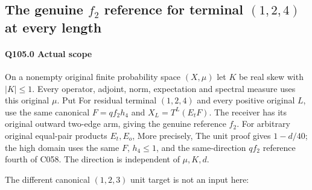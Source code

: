 \subsection{The genuine $f_2$ reference for terminal $(1,\allowbreak 2,\allowbreak 4)$ at every length}\label{proof:Q5-C105}
\paragraph{Q105.0 Actual scope}\label{part:Q105.0}
On a nonempty original finite probability space $(X,\allowbreak \mu)$ let $K$ be real
skew with $|K|\le\allowbreak 1$. Every operator, adjoint, norm, expectation and spectral
measure uses this original $\mu$. Put
For residual terminal $(1,\allowbreak 2,\allowbreak 4)$ and every positive original $L$, use the
same canonical $F=\allowbreak qf_2h_4$ and $X_L=\allowbreak T^L(E_tF)$.
The receiver has its original outward two-edge arm, giving the genuine
reference $f_2$. For arbitrary original equal-pair products $E_t,\allowbreak E_o$,
More precisely,
The unit proof gives $1-d/40$; the high domain uses the same $F$,
$h_4\le\allowbreak 1$, and the same-direction $qf_2$ reference fourth of C058.
The direction is independent of $\mu,\allowbreak K,\allowbreak d$.

The different canonical $(1,\allowbreak 2,\allowbreak 3)$ unit target is not an input here:


